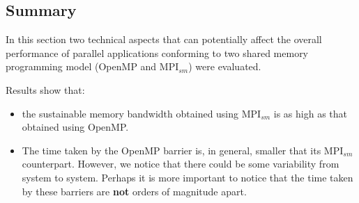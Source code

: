 \medskip



\subsection*{Summary}

In this section two technical aspects that can potentially affect the overall performance of parallel applications conforming to two shared memory programming model (OpenMP and MPI$_{sm}$) were evaluated.

\medskip

Results show that: 

\begin{itemize} 

    \item the sustainable memory bandwidth obtained using MPI$_{sm}$ is as high as that obtained using OpenMP.

    \item The time taken by the OpenMP barrier is, in general, smaller that its MPI$_{sm}$ counterpart. However, we notice that there could be some variability from system to system. Perhaps it is more important to notice that the time taken by these barriers are \textbf{not} orders of magnitude apart.

\end{itemize}


\medskip


